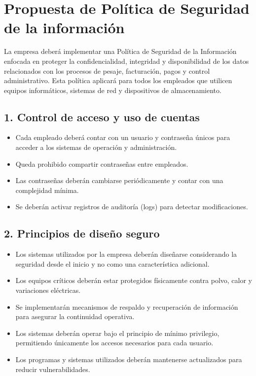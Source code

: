 \section{Propuesta de Política de Seguridad de la información}
La empresa deberá implementar una Política de Seguridad de la Información enfocada en proteger la confidencialidad, integridad y disponibilidad de los datos relacionados con los procesos de pesaje, facturación, pagos y control administrativo. Esta política aplicará para todos los empleados que utilicen equipos informáticos, sistemas de red y dispositivos de almacenamiento.

\subsection*{1. Control de acceso y uso de cuentas}
\begin{itemize}
    \item Cada empleado deberá contar con un usuario y contraseña únicos para acceder a los sistemas de operación y administración.
    \item Queda prohibido compartir contraseñas entre empleados.
    \item Las contraseñas deberán cambiarse periódicamente y contar con una complejidad mínima.
    \item Se deberán activar registros de auditoría (logs) para detectar modificaciones.
\end{itemize}

\subsection*{2. Principios de diseño seguro}
\begin{itemize}
    \item Los sistemas utilizados por la empresa deberán diseñarse considerando la seguridad desde el inicio y no como una característica adicional.
    \item Los equipos críticos deberán estar protegidos físicamente contra polvo, calor y variaciones eléctricas.
    \item Se implementarán mecanismos de respaldo y recuperación de información para asegurar la continuidad operativa.
    \item Los sistemas deberán operar bajo el principio de mínimo privilegio, permitiendo únicamente los accesos necesarios para cada usuario.
    \item Los programas y sistemas utilizados deberán mantenerse actualizados para reducir vulnerabilidades.
\end{itemize}

